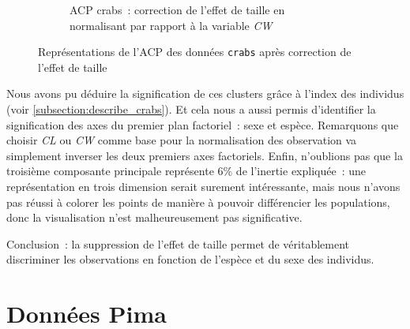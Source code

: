 \documentclass[a4paper,11pt]{report}
\begin{document}
\begin{figure}[H]
\begin{subfigure}[b]{0.5\linewidth}
		\caption{\scriptsize ACP crabs~: correction de l'effet de taille en normalisant par rapport à la variable \textit{CW}}
		\label{fig:biplot_acp_crabs_corrected_CW}
	\end{subfigure}%
	\caption{
		\small Représentations de l'ACP des données \texttt{crabs} après correction de l'effet de taille
	}
	\label{fig:biplots_crabs_corrected}%
\end{figure}

Nous avons pu déduire la signification de ces clusters grâce à l'index des individus (voir \autoref{subsection:describe_crabs}). Et cela nous a aussi permis d'identifier la signification des axes du premier plan factoriel~: sexe et espèce. Remarquons que choisir \textit{CL} ou \textit{CW} comme base pour la normalisation des observation va simplement inverser les deux premiers axes factoriels. Enfin, n'oublions pas que la troisième composante principale représente 6\% de l'inertie expliquée~: une représentation en trois dimension serait surement intéressante, mais nous n'avons pas réussi à colorer les points de manière à pouvoir différencier les populations, donc la visualisation n'est malheureusement pas significative.

Conclusion~: la suppression de l'effet de taille permet de véritablement discriminer les observations en fonction de l'espèce et du sexe des individus.

\section{Données Pima}
\label{sec:2_4_ACP_Pima}
\end{document}
